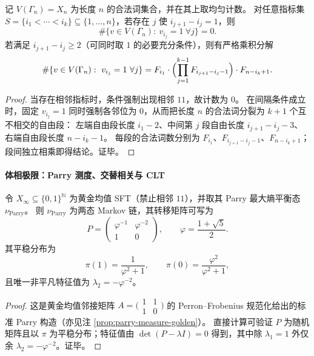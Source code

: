 \begin{theorem}\label{thm:pom-fibcube-kpoint-count}
记 \(V(\Gamma_n)=X_n\) 为长度 \(n\) 的合法词集合，并在其上取均匀计数。
对任意指标集 \(S=\{i_1<\cdots<i_k\}\subseteq\{1,\dots,n\}\)，若存在 \(j\) 使 \(i_{j+1}-i_j=1\)，则
\[
\#\{v\in V(\Gamma_n):\ v_{i_j}=1\ \forall j\}=0.
\]
若满足 \(i_{j+1}-i_j\ge 2\)（可同时取 \(1\) 的必要充分条件），则有严格乘积分解
\[
\#\{v\in V(\Gamma_n):\ v_{i_j}=1\ \forall j\}
=
F_{i_1}\cdot
\Bigl(\prod_{j=1}^{k-1}F_{i_{j+1}-i_j-1}\Bigr)\cdot
F_{n-i_k+1}.
\]
\end{theorem}
\begin{proof}
当存在相邻指标时，条件强制出现相邻 \(11\)，故计数为 \(0\)。
在间隔条件成立时，固定 \(v_{i_j}=1\) 同时强制各邻位为 \(0\)，从而把长度 \(n\) 的合法词分裂为 \(k+1\) 个互不相交的自由段：
左端自由段长度 \(i_1-2\)、中间第 \(j\) 段自由长度 \(i_{j+1}-i_j-3\)、右端自由段长度 \(n-i_k-1\)。
每段的合法词数分别为 \(F_{i_1}\)、\(F_{i_{j+1}-i_j-1}\)、\(F_{n-i_k+1}\)；
段间独立相乘即得结论。证毕。
\end{proof}

\paragraph{体相极限：Parry 测度、交替相关与 CLT}

\begin{theorem}\label{thm:pom-parry-limit-chain-explicit}
令 \(X_\infty\subseteq\{0,1\}^{\mathbb N}\) 为黄金均值 SFT（禁止相邻 \(11\)），并取其 Parry 最大熵平衡态 \(\nu_{\mathrm{Parry}}\)。
则 \(\nu_{\mathrm{Parry}}\) 为两态 Markov 链，其转移矩阵可写为
\[
P=\begin{pmatrix}
\varphi^{-1} & \varphi^{-2}\\
1 & 0
\end{pmatrix},
\qquad \varphi=\frac{1+\sqrt5}{2}.
\]
其平稳分布为
\[
\pi(1)=\frac{1}{\varphi^2+1},\qquad
\pi(0)=\frac{\varphi^2}{\varphi^2+1},
\]
且唯一非平凡特征值为 \(\lambda_2=-\varphi^{-2}\)。
\end{theorem}
\begin{proof}
这是黄金均值邻接矩阵 \(A=\bigl(\begin{smallmatrix}1&1\\1&0\end{smallmatrix}\bigr)\) 的 Perron--Frobenius 规范化给出的标准 Parry 构造（亦见注 \ref{prop:parry-measure-golden}）。
直接计算可验证 \(P\) 为随机矩阵且以 \(\pi\) 为平稳分布；特征值由 \(\det(P-\lambda I)=0\) 得到，其中除 \(\lambda_1=1\) 外仅余 \(\lambda_2=-\varphi^{-2}\)。证毕。
\end{proof}

